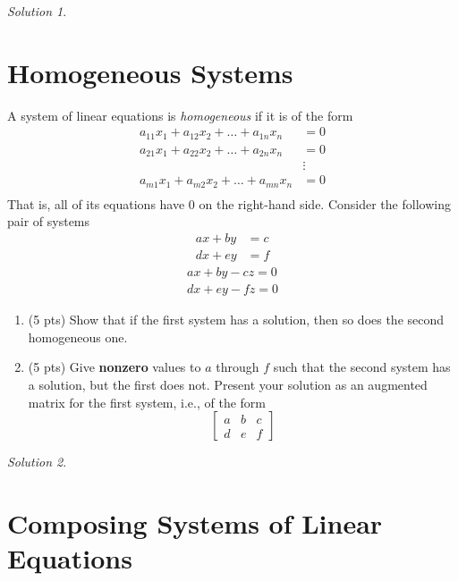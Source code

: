 \documentclass{article}
\theoremstyle{remark}
\newtheorem*{solution}{Solution}
\begin{document}
\begin{solution}
\end{solution}

\pagebreak
\section{Homogeneous Systems}

A system of linear equations is \textit{homogeneous} if it is of the form
\begin{align*}
  a_{11}x_1 + a_{12}x_2 + \dots + a_{1n}x_n &= 0\\
  a_{21}x_1 + a_{22}x_2 + \dots + a_{2n}x_n &= 0\\
  &\vdots \\
  a_{m1}x_1 + a_{m2}x_2 + \dots + a_{mn}x_n &= 0\\
\end{align*}
That is, all of its equations have $0$ on the right-hand side.
Consider the following pair of systems
\begin{align*}
  ax + by &= c \\
  dx + ey &= f
\end{align*}
\begin{align*}
  ax + by - cz = 0 \\
  dx + ey - fz = 0
\end{align*}
\begin{enumerate}
\item (5 pts) Show that if the first system has a solution, then so does the second homogeneous one.
\item (5 pts) Give \textbf{nonzero} values to $a$ through $f$ such that the second system has a solution, but the first does not. Present your solution as an augmented matrix for the first system, i.e., of the form
  \begin{displaymath}
    \begin{bmatrix}
      a & b & c \\
      d & e & f
    \end{bmatrix}
  \end{displaymath}
\end{enumerate}

\begin{solution}
\end{solution}

\pagebreak
\section{Composing Systems of Linear Equations}
\end{document}
